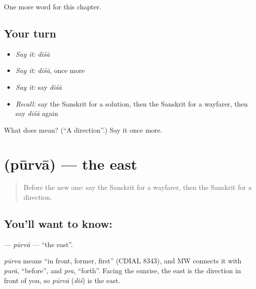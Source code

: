 \begin{grammarlens}[title={What you've built}]
One more word for this chapter.
\end{grammarlens}

\subsection*{Your turn}
\begin{itemize}
\raggedright
  \item \emph{Say it:} \emph{diśā}
  \item \emph{Say it:} \emph{diśā}, once more
  \item \emph{Say it:} say \emph{diśā}
  \item \emph{Recall:} say the Sanskrit for a solution, then the Sanskrit for a wayfarer, then say \emph{diśā} again
\end{itemize}

\begin{tcolorbox}[breakable,colback=teal!4,colframe=teal!35!black,title={Before you move on}]
What does  mean? (\textquotedblleft{}A direction\textquotedblright{}.) Say it once more.
\end{tcolorbox}
\section[\texorpdfstring{\sk{पूर्वा} (pūrvā)}{पूर्वा (pūrvā)}]{ (pūrvā) — the east}

\label{lesson:SA-C202-purva}



\begin{quote}
Before the new one: say the Sanskrit for a wayfarer, then the Sanskrit for a direction.
\end{quote}

\subsection*{You'll want to know: }
\textbf{} — \emph{pūrvā} — \textquotedblleft{}the east\textquotedblright{}.

\begin{cousinweb}
\emph{pūrva} means \textquotedblleft{}in front, former, first\textquotedblright{} (CDIAL 8343), and MW connects it with \emph{purā}, \textquotedblleft{}before\textquotedblright{}, and \emph{pra}, \textquotedblleft{}forth\textquotedblright{}. Facing the sunrise, the east is the direction in front of you, so \emph{pūrvā} (\emph{diś}) is the east.
\end{cousinweb}

